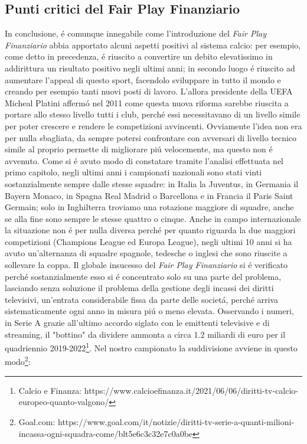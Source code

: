 \documentclass[
    corpo=12pt,
    oneside,
    evenboxes,
    tipotesi=triennale,
    stile=classica,
    oldstyle,
    autoretitolo,
    greek,
]{toptesi}
\begin{document}
\begin{interlinea}{1.5}
\section{Punti critici del Fair Play Finanziario}
In conclusione, \'e comunque innegabile come l'introduzione del \emph{Fair Play Finanziario} abbia apportato alcuni aspetti positivi al 
sistema calcio: per esempio, come detto in precedenza, \'e riuscito a convertire un debito elevatissimo in addirittura un risultato positivo
negli ultimi anni; in secondo luogo \'e riuscito ad aumentare l'appeal di questo sport, facendolo sviluppare in tutto il mondo e creando per esempio
tanti nuovi posti di lavoro. L'allora presidente della UEFA Micheal Platini afferm\'o nel 2011 come questa nuova
riforma sarebbe riuscita a portare allo stesso livello tutti i club, perch\'e essi necessitavano di un livello simile per poter crescere e 
rendere le competizioni avvincenti. Ovviamente l'idea non era per nulla sbagliata, da sempre potersi confrontare con avversari di livello tecnico simile
al proprio permette di migliorare pi\'u velocemente, ma questo non \'e avvenuto. Come si \'e avuto modo di constatare tramite l'analisi
effettuata nel primo capitolo, negli ultimi anni i campionati nazionali sono stati vinti sostanzialmente sempre dalle stesse squadre:
in Italia la Juventus, in Germania il Bayern Monaco, in Spagna Real Madrid o Barcellona e in Francia il Paris Saint Germain; solo 
in Inghilterra troviamo una rotazione maggiore di squadre, anche se alla fine sono sempre le stesse quattro o cinque. Anche in campo
internazionale la situazione non \'e per nulla diversa perch\'e per quanto riguarda la due maggiori competizioni (Champions League ed Europa
League), negli ultimi 10 anni si ha avuto un'alternanza di squadre spagnole, tedesche o inglesi che sono riuscite a sollevare la coppa.
Il globale insucesso del \emph{Fair Play Finanziario} si \'e verificato perch\'e sostanzialmente esso si \'e concentrato solo su una parte del problema,
lasciando senza soluzione il problema della gestione degli incassi dei diritti televisivi, un'entrata considerabile fissa da parte 
delle societ\'a, perch\'e arriva sistematicamente ogni anno in misura pi\'u o meno elevata. Osservando i numeri, in Serie A grazie all'ultimo
accordo siglato con le emittenti televisive e di streaming, il "bottino" da dividere ammonta a circa 1.2 miliardi di euro per il quadriennio 
2019-2022\footnote{Calcio e Finanza: https://www.calcioefinanza.it/2021/06/06/diritti-tv-calcio-europeo-quanto-valgono/}. Nel nostro campionato
la suddivisione avviene in questo modo\footnote{Goal.com: https://www.goal.com/it/notizie/diritti-tv-serie-a-quanti-milioni-incassa-ogni-squadra-come/blt5e6c3c32e7c0a0be}:

\end{interlinea}
\end{document}
